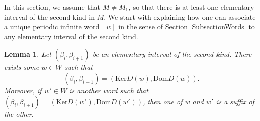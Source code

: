\documentclass[12pt]{amsart}
\newtheorem{lemma}[theorem]{Lemma}
\theoremstyle{definition}
\newcommand{\<}{\langle}   %
\renewcommand{\>}{\rangle} %
\begin{document}
In this section, we assume that $M \not = M_1$, so that there is at least one elementary interval of the second kind in $M$. We start with explaining how one can associate a unique periodic infinite word $[w]$ in the sense of Section \ref{SubsectionWords} to any elementary interval of the second kind. 

\begin{lemma}\label{ShapeOfIntervalsOfSecondKind}
    Let $(\beta_i,\beta_{i+1})$ be an elementary interval of the second kind. There exists some $w \in W$ such that 
    \begin{equation*}
        (\beta_i,\beta_{i+1}) = (\mathrm{Ker}D(w), \mathrm{Dom}D(w)).
    \end{equation*}
    Moreover, if $w' \in W$ is another word such that $(\beta_i,\beta_{i+1}) = (\mathrm{Ker}D(w'), \mathrm{Dom}D(w'))$, then one of $w$ and $w'$ is a suffix of the other.
\end{lemma}
\end{document}
